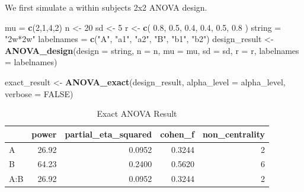 \documentclass[]{book}
\newenvironment{Shaded}{\begin{snugshade}}{\end{snugshade}}
\newcommand{\DataTypeTok}[1]{\textcolor[rgb]{0.13,0.29,0.53}{#1}}
\newcommand{\DecValTok}[1]{\textcolor[rgb]{0.00,0.00,0.81}{#1}}
\newcommand{\FloatTok}[1]{\textcolor[rgb]{0.00,0.00,0.81}{#1}}
\newcommand{\KeywordTok}[1]{\textcolor[rgb]{0.13,0.29,0.53}{\textbf{#1}}}
\newcommand{\NormalTok}[1]{#1}
\newcommand{\OtherTok}[1]{\textcolor[rgb]{0.56,0.35,0.01}{#1}}
\newcommand{\StringTok}[1]{\textcolor[rgb]{0.31,0.60,0.02}{#1}}
\begin{document}
We first simulate a within subjects 2x2 ANOVA design.

\begin{Shaded}
\begin{Highlighting}[]
\NormalTok{mu =}\StringTok{ }\KeywordTok{c}\NormalTok{(}\DecValTok{2}\NormalTok{,}\DecValTok{1}\NormalTok{,}\DecValTok{4}\NormalTok{,}\DecValTok{2}\NormalTok{) }
\NormalTok{n <-}\StringTok{ }\DecValTok{20}
\NormalTok{sd <-}\StringTok{ }\DecValTok{5}
\NormalTok{r <-}\StringTok{ }\KeywordTok{c}\NormalTok{(}
  \FloatTok{0.8}\NormalTok{, }\FloatTok{0.5}\NormalTok{, }\FloatTok{0.4}\NormalTok{,}
       \FloatTok{0.4}\NormalTok{, }\FloatTok{0.5}\NormalTok{,}
            \FloatTok{0.8}
\NormalTok{  )}
\NormalTok{string =}\StringTok{ "2w*2w"}
\NormalTok{labelnames =}\StringTok{ }\KeywordTok{c}\NormalTok{(}\StringTok{"A"}\NormalTok{, }\StringTok{"a1"}\NormalTok{, }\StringTok{"a2"}\NormalTok{, }\StringTok{"B"}\NormalTok{, }\StringTok{"b1"}\NormalTok{, }\StringTok{"b2"}\NormalTok{)}
\NormalTok{design_result <-}\StringTok{ }\KeywordTok{ANOVA_design}\NormalTok{(}\DataTypeTok{design =}\NormalTok{ string,}
                              \DataTypeTok{n =}\NormalTok{ n, }
                              \DataTypeTok{mu =}\NormalTok{ mu, }
                              \DataTypeTok{sd =}\NormalTok{ sd, }
                              \DataTypeTok{r =}\NormalTok{ r, }
                              \DataTypeTok{labelnames =}\NormalTok{ labelnames)}

\NormalTok{exact_result <-}\StringTok{ }\KeywordTok{ANOVA_exact}\NormalTok{(design_result,}
                            \DataTypeTok{alpha_level =}\NormalTok{ alpha_level,}
                            \DataTypeTok{verbose =} \OtherTok{FALSE}\NormalTok{)}
\end{Highlighting}
\end{Shaded}

\begin{table}[t]

\caption{\label{tab:unnamed-chunk-210}Exact ANOVA Result}
\centering
\begin{tabular}{l|r|r|r|r}
\hline
  & power & partial\_eta\_squared & cohen\_f & non\_centrality\\
\hline
A & 26.92 & 0.0952 & 0.3244 & 2\\
\hline
B & 64.23 & 0.2400 & 0.5620 & 6\\
\hline
A:B & 26.92 & 0.0952 & 0.3244 & 2\\
\hline
\end{tabular}
\end{table}
\end{document}
